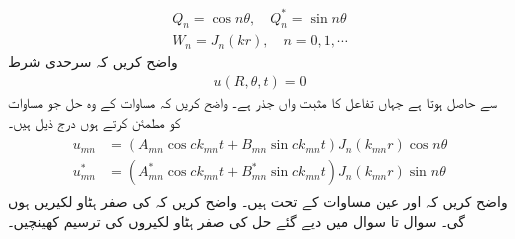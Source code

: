 \begin{align}
Q_n=\cos n\theta, \quad Q^*_n=\sin n\theta\label{مساوات_جزوی_سوال_ث}\\
W_n=J_n(kr),\quad n=0,1,\cdots\label{مساوات_جزوی_سوال_ج}
\end{align}
\quad
واضح کریں کہ سرحدی شرط
\begin{align}\label{مساوات_جزوی_سوال_چ}
u(R,\theta,t)=0
\end{align}
سے  حاصل ہوتا ہے جہاں  تفاعل  کا مثبت  واں جذر ہے۔
\quad
واضح کریں کہ مساوات  کے وہ حل جو مساوات  کو مطمئن کرتے ہوں درج ذیل ہیں۔
\begin{gather}
\begin{aligned}\label{مساوات_جزوی_سوال_ح}
u_{mn}&=(A_{mn}\cos ck_{mn}t+B_{mn}\sin ck_{mn}t)J_n(k_{mn}r)\cos n\theta\\
u^*_{mn}&=(A^*_{mn}\cos ck_{mn}t+B^*_{mn}\sin ck_{mn}t)J_n(k_{mn}r)\sin n\theta
\end{aligned}
\end{gather}
\quad
واضح کریں کہ   اور   عین مساوات  کے تحت ہیں۔
\quad
واضح کریں کہ  کی   صفر ہٹاو لکیریں ہوں گی۔
سوال  تا سوال  میں دیے گئے حل کی صفر ہٹاو لکیروں کی ترسیم کھینچیں۔

